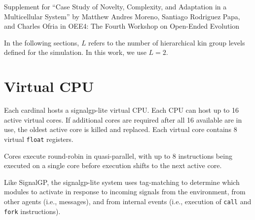 \clearpage
\onecolumn

\vspace*{\fill}
{\Huge
Supplement for ``Case Study of Novelty, Complexity, and Adaptation in a Multicellular System'' by Matthew Andres Moreno, Santiago Rodriguez Papa, and Charles Ofria
in OEE4: The Fourth Workshop on Open-Ended Evolution}
\vspace*{\fill}

\clearpage

\setcounter{secnumdepth}{2}



\clearpage
\twocolumn






% 


In the following sections, $L$ refers to the number of hierarchical kin group levels defined for the simulation.
In this work, we use $L=2$.

\section{Virtual CPU} \label{sec:virtual_cpu}

Each cardinal hosts a signalgp-lite virtual CPU.
Each CPU can host up to 16 active virtual cores.
If additional cores are required after all 16 available are in use, the oldest active core is killed and replaced.
Each virtual core contains 8 virtual \texttt{float} registers.

Cores execute round-robin in quasi-parallel, with up to 8 instructions being executed on a single core before execution shifts to the next active core. 

Like SignalGP, the signalgp-lite system uses tag-matching to determine which modules to activate in response to incoming signals from the environment, from other agents (i.e., messages), and from internal events (i.e., execution of \texttt{call} and \texttt{fork} instructions).

